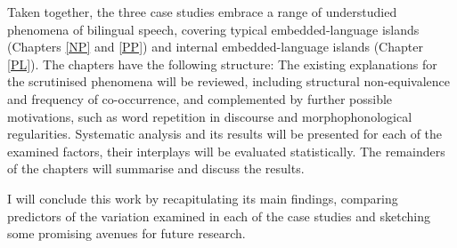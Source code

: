 Taken together, the three case studies embrace a range of understudied phenomena of bilingual speech, covering typical embedded-language islands (Chapters \ref{NP} and \ref{PP}) and internal embedded-language islands (Chapter \ref{PL}). The chapters have the following structure: The existing explanations for the scrutinised phenomena will be reviewed, including structural non-equivalence and frequency of co-occurrence, and complemented by further possible motivations, such as word repetition in discourse and morphophonological regularities. Systematic analysis and its results will be presented for each of the examined factors, their interplays will be evaluated statistically. The remainders of the chapters will summarise and discuss the results.

I will conclude this work by recapitulating its main findings, comparing predictors of the variation examined in each of the case studies and sketching some promising avenues for future research.


